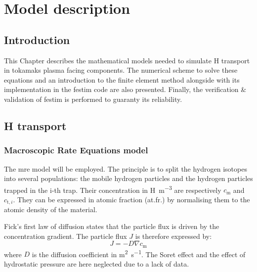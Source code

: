 \setchapterpreamble[u]{\margintoc}
\chapter{Model description}
\label{Chapter2} %
\section{Introduction}
This Chapter describes the mathematical models needed to simulate H transport in tokamaks plasma facing components.
The numerical scheme to solve these equations and an introduction to the finite element method alongside with its implementation in the \gls{festim} code are also presented.
Finally, the verification \& validation of \gls{festim} is performed to guaranty its reliability.

\section{H transport} \label{description_H_transport_model}


\subsection{Macroscopic Rate Equations model}

The \gls{mre} model will be employed.
The principle is to split the hydrogen isotopes into several populations: the mobile hydrogen particles and the hydrogen particles trapped in the i-th trap.
Their concentration in \si{H.m^{-3}} are respectively $c_\mathrm{m}$ and $c_{\mathrm{t},i}$.
They can be expressed in atomic fraction (at.fr.) by normalising them to the atomic density of the material.

Fick's first law of diffusion states that the particle flux is driven by the concentration gradient.
The particle flux $J$ is therefore expressed by:
\begin{equation}
    J = - D \nabla c_\mathrm{m}
\end{equation}
where $D$ is the diffusion coefficient in \si{m^2.s^{-1}}.
The Soret effect and the effect of hydrostatic pressure are here neglected due to a lack of data.


